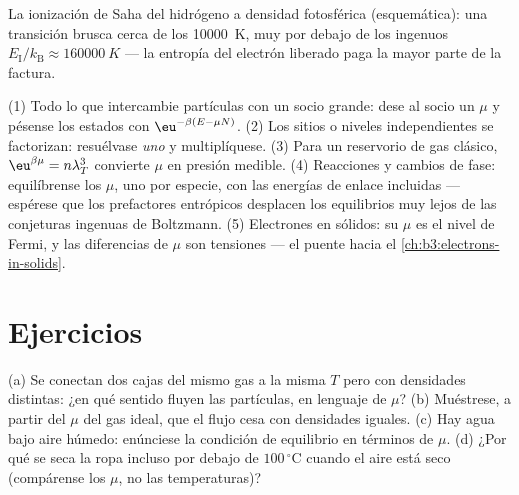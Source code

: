 \begin{omfigure}

{\small La ionización de Saha del hidrógeno a densidad fotosférica
(esquemática): una transición brusca cerca de los \qty{10000}{K}, muy por
debajo de los ingenuos $E_{\text{I}}/k_{\text{B}} \approx \qty{160000}{K}$
--- la entropía del electrón liberado paga la mayor parte de la factura.}
\end{omfigure}

\begin{method}\label{met:b3:grand-canonical:method}
(1) Todo lo que intercambie partículas con un socio grande: dese al
socio un $\mu$ y pésense los estados con $\eu^{-\beta(E - \mu N)}$.
(2) Los sitios o niveles independientes se factorizan: resuélvase \emph{uno}
y multiplíquese. (3) Para un reservorio de gas clásico, $\eu^{\beta\mu} =
n\lambda_T^3$ convierte $\mu$ en presión medible. (4) Reacciones
y cambios de fase: equilíbrense los $\mu$, uno por especie, con las energías
de enlace incluidas --- espérese que los prefactores entrópicos desplacen
los equilibrios muy lejos de las conjeturas ingenuas de Boltzmann. (5)
Electrones en sólidos: su $\mu$ es el nivel de Fermi, y las diferencias de
$\mu$ son tensiones --- el puente hacia el
\cref{ch:b3:electrons-in-solids}.
\end{method}

\section{Ejercicios}

\begin{exercise}[$\star$]\label{exo:b3:grand-canonical:1}
(a) Se conectan dos cajas del mismo gas a la misma $T$ pero con densidades
distintas: ¿en qué sentido fluyen las partículas, en lenguaje de
$\mu$? (b) Muéstrese, a partir del $\mu$ del gas ideal, que el flujo cesa
con densidades iguales. (c) Hay agua bajo aire húmedo: enúnciese la
condición de equilibrio en términos de $\mu$. (d) ¿Por qué se seca la ropa
incluso por debajo de $100\,^\circ$C cuando el aire está seco (compárense los
$\mu$, no las temperaturas)?
\end{exercise}

